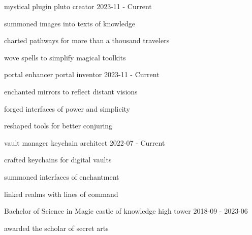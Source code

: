 \documentclass[18pt, letterpaper]{awesome-cv}
\begin{document}
\begin{cventries}


\cventry
{mystical plugin}
{pluto}
{creator}
{2023-11 - Current}
{
\begin{cvitems}
    \item{summoned images into texts of knowledge}
    \item{charted pathways for more than a thousand travelers}
    \item{wove spells to simplify magical toolkits}
\end{cvitems}
}
\vspace{6mm}
\cventry
{portal enhancer}
{portal}
{inventor}
{2023-11 - Current}
{
\begin{cvitems}
    \item{enchanted mirrors to reflect distant visions}
    \item{forged interfaces of power and simplicity}
    \item{reshaped tools for better conjuring}
\end{cvitems}
}
\vspace{6mm}
\cventry
{vault manager}
{keychain}
{architect}
{2022-07 - Current}
{
\begin{cvitems}
    \item{crafted keychains for digital vaults}
    \item{summoned interfaces of enchantment}
    \item{linked realms with lines of command}
\end{cvitems}
}
\vspace{6mm}
\end{cventries}


\begin{cventries}

\cventry
{Bachelor of Science in Magic}
{castle of knowledge}
{high tower}
{2018-09 - 2023-06}
{
\begin{cvitems}
    \item{awarded the scholar of secret arts}
\end{cvitems}
}
\vspace{6mm}
\end{cventries}
\end{document}

